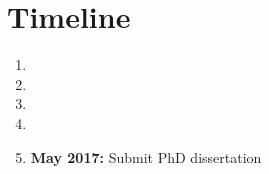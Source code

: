 \section{Timeline}
\label{sec:timeline}

\begin{enumerate}
\item 
\item 
\item 
\item 
\item \textbf{May 2017:} Submit PhD dissertation
\end{enumerate}

